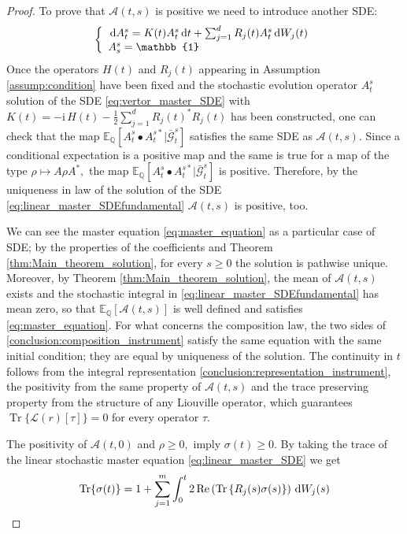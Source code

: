 \begin{proof}
	 To prove that $ \mathcal{A}(t, s) $ is positive we need to introduce another SDE:
	 \begin{equation}\label{eq:vertor_master_SDE}
	 	\left\{\begin{array}{l}\diff A_{t}^{s}=K(t) A_{t}^{s} \diff t+\sum_{j=1}^{d} R_{j}(t) A_{t}^{s} \diff W_{j}(t) \\ A_{s}^{s}=\mathbb{1}\end{array}\right.
	 \end{equation}
	 Once the operators $H(t)$ and $R_{j}(t)$ appearing in Assumption \ref{assump:condition} have been fixed and the stochastic evolution operator $A_{t}^{s}$ solution of the SDE \eqref{eq:vertor_master_SDE} with $K(t)=-\mathrm{i}\, H(t)-\frac{1}{2} \sum_{j=1}^{d} R_{j}(t)^{*} R_{j}(t)$ has been constructed, one can check that the map $\mathbb{E}_{\mathbb{Q}}\left[A_{t}^{s} \bullet A_{t}^{s *} | \bar{\mathcal{G}}_{t}^{s}\right]$ satisfies the same SDE as $\mathcal{A}(t, s)$. Since a conditional expectation is a positive map and the same is true for a map of the type $\rho \mapsto A \rho A^{*},$ the map $\mathbb{E}_{\mathbb{Q}}\left[A_{t}^{s} \bullet A_{t}^{s *} | \bar{\mathcal{G}}_{t}^{s}\right]$ is positive. Therefore, by the uniqueness in law of the solution of the SDE \eqref{eq:linear_master_SDEfundamental} $ \mathcal{A}(t, s)$ is positive, too.

	 We can see the master equation \eqref{eq:master_equation} as a particular case of SDE; by the properties of the coefficients and Theorem \ref{thm:Main_theorem_solution}, for every $s \geq 0$ the solution is pathwise unique. Moreover, by Theorem \ref{thm:Main_theorem_solution}, the mean of $\mathcal{A}(t, s)$ exists and the stochastic integral in \eqref{eq:linear_master_SDEfundamental} has mean zero, so that $\mathbb{E}_{\mathbb{Q}}[\mathcal{A}(t, s)]$ is well defined and satisfies \eqref{eq:master_equation}. For what concerns the composition law, the two sides of \eqref{conclusion:composition_instrument} satisfy the same equation with the same initial condition; they are equal by uniqueness of the solution. The continuity in $t$ follows from the integral representation \eqref{conclusion:representation_instrument}, the positivity from the same property of $\mathcal{A}(t, s)$ and the trace preserving property from the structure of any Liouville operator, which guarantees $\operatorname{Tr}\{\mathcal{L}(r)[\tau]\}=0$ for every operator $\tau .$

	 The positivity of $\mathcal{A}(t, 0)$ and $\rho \geq 0,$ imply $\sigma(t) \geq 0$. By taking the trace of the linear stochastic master equation \eqref{eq:linear_master_SDE} we get  \begin{equation}\label{eq:trace_sigma(t)}
	 \operatorname{Tr}\{\sigma(t)\}=1+\sum_{j=1}^{m} \int_{0}^{t} 2 \operatorname{Re}\left(\operatorname{Tr}\left\{R_{j}(s) \sigma(s)\right\}\right) \,\mathrm{d} W_{j}(s)
	 \end{equation}


\end{proof}
